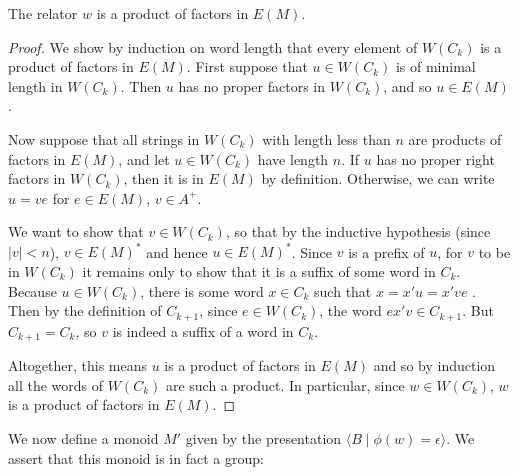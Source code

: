 \documentclass[showlabels,noindex,12pt]{lmaths}
\begin{document}
\begin{prop} \label{lma:relator-factors-E(M)}
	The relator $w$ is a product of factors in $E(M)$.
\end{prop}
\begin{proof}
	\hspace{-0.25mm}We show by induction on word length that every element of $W(C_k)$ is a product of factors in $E(M)$. First suppose that $u \in W(C_k)$ is of minimal length in $W(C_k)$. Then $u$ has no proper factors in $W(C_k)$, and so $u \in E(M)$.

	Now suppose that all strings in $W(C_k)$ with length less than $n$ are products of factors in $E(M)$, and let $u \in W(C_k)$ have length $n$. If $u$ has no proper right factors in $W(C_k)$, then it is in $E(M)$ by definition. Otherwise, we can write $u = ve$ for $e \in E(M)$, $v \in A^+$.

	We want to show that $v \in W(C_k)$, so that by the inductive hypothesis (since $|v| < n$), $v \in E(M)^*$ and hence $u \in E(M)^*$. Since $v$ is a prefix of $u$, for $v$ to be in $W(C_k)$ it remains only to show that it is a suffix of some word in $C_k$. Because $u \in W(C_k)$, there is some word $x \in C_k$ such that $x = x'u = x've$ . Then by the definition of $C_{k+1}$, since $e \in W(C_k)$, the word $ex'v \in C_{k+1}$. But $C_{k+1} = C_k$, so $v$ is indeed a suffix of a word in $C_k$.

	Altogether, this means $u$ is a product of factors in $E(M)$ and so by induction all the words of $W(C_k)$ are such a product. In particular, since $w \in W(C_k)$, $w$ is a product of factors in $E(M)$.
\end{proof}

We now define a monoid $M'$ given by the presentation $\langle B \mid \phi(w) = \epsilon \rangle$. We assert that this monoid is in fact a group:
\end{document}
